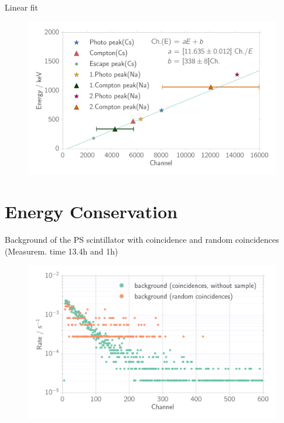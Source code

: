 \documentclass[xcolor=x11names,compress]{beamer}
\renewcommand{\(}{\begin{columns}}
\renewcommand{\)}{\end{columns}}
\newcommand{\<}[1]{\begin{column}{#1}}
\renewcommand{\>}{\end{column}}
\begin{document}
\begin{frame}[t]{Linear fit}
 \begin{figure}[htpb]
    \centering
    \includegraphics[width=1.0\linewidth]{../analysis/figures/calibration_na_linear_fit}
    \label{fig:calibration_na_linear_fit}
\end{figure}
   
\end{frame}
\section{Energy Conservation}

\begin{frame}[t]{Background of the PS scintillator with coincidence
    and random coincidences (Measurem. time 13.4h and 1h)}
    \begin{figure}[htpb]
    \centering
    \includegraphics[width=1.0\linewidth]{../analysis/figures/coin_background_random}
    \label{fig:coin_ps_background}
\end{figure}

\end{frame}
\end{document}
